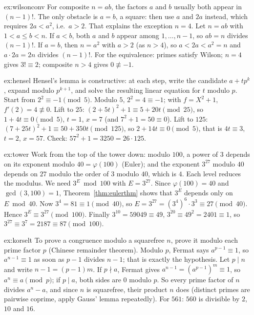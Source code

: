\begin{solution}{ex:wilsonconv}
\idea For composite $n=ab$, the factors $a$ and $b$ usually both appear in $(n-1)!$. The only obstacle is $a=b$, a square: then use $a$ and $2a$ instead, which requires $2a<a^2$, i.e.\ $a>2$. That explains the exception $n=4$.
\writeup Let $n=ab$ with $1<a\le b<n$. If $a<b$, both $a$ and $b$ appear among $1,\dots,n-1$, so $ab=n$ divides $(n-1)!$. If $a=b$, then $n=a^2$ with $a>2$ (as $n>4$), so $a<2a<a^2=n$ and $a\cdot2a=2n$ divides $(n-1)!$. For the equivalence: primes satisfy Wilson; $n=4$ gives $3!\equiv2$; composite $n>4$ gives $0\not\equiv-1$.
\end{solution}

\begin{solution}{ex:hensel}
\idea Hensel's lemma is constructive: at each step, write the candidate $a+tp^k$, expand modulo $p^{k+1}$, and solve the resulting linear equation for $t$ modulo $p$. Start from $2^2\equiv-1\pmod5$.
\writeup Modulo $5$, $2^2=4\equiv-1$; with $f=X^2+1$, $f'(2)=4\not\equiv0$. Lift to $25$: $(2+5t)^2+1\equiv5+20t\pmod{25}$, so $1+4t\equiv0\pmod5$, $t=1$, $x=7$ (and $7^2+1=50\equiv0$). Lift to $125$: $(7+25t)^2+1\equiv50+350t\pmod{125}$, so $2+14t\equiv0\pmod5$, that is $4t\equiv3$, $t=2$, $x=57$. Check: $57^2+1=3250=26\cdot125$.
\end{solution}

\begin{solution}{ex:tower}
\idea Work from the top of the tower down: modulo $100$, a power of $3$ depends on its exponent modulo $40=\varphi(100)$ (Euler); and the exponent $3^{27}$ modulo $40$ depends on $27$ modulo the order of $3$ modulo $40$, which is $4$. Each level reduces the modulus.
\writeup We need $3^E\bmod100$ with $E=3^{27}$. Since $\varphi(100)=40$ and $\gcd(3,100)=1$, Theorem~\ref{thm:eulerthm} shows that $3^E$ depends only on $E\bmod40$. Now $3^4=81\equiv1\pmod{40}$, so $E=3^{27}=(3^4)^6\cdot3^3\equiv27\pmod{40}$. Hence $3^E\equiv3^{27}\pmod{100}$. Finally $3^{10}=59049\equiv49$, $3^{20}\equiv49^2=2401\equiv1$, so $3^{27}\equiv3^7=2187\equiv87\pmod{100}$.
\end{solution}

\begin{solution}{ex:korselt}
\idea To prove a congruence modulo a squarefree $n$, prove it modulo each prime factor $p$ (Chinese remainder theorem). Modulo $p$, Fermat says $a^{p-1}\equiv1$, so $a^{n-1}\equiv1$ as soon as $p-1$ divides $n-1$; that is exactly the hypothesis.
\writeup Let $p\mid n$ and write $n-1=(p-1)m$. If $p\nmid a$, Fermat gives $a^{n-1}=(a^{p-1})^m\equiv1$, so $a^n\equiv a\pmod p$; if $p\mid a$, both sides are $0$ modulo $p$. So every prime factor of $n$ divides $a^n-a$, and since $n$ is squarefree, their product $n$ does (distinct primes are pairwise coprime, apply Gauss' lemma repeatedly). For $561$: $560$ is divisible by $2$, $10$ and $16$.
\end{solution}

